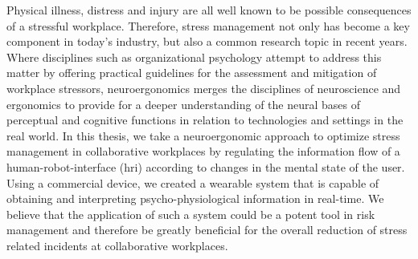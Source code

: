 
Physical illness, distress and injury are all well known to be possible consequences of a stressful workplace. 
Therefore, stress management not only has become a key component in today's industry, but also a common research topic in recent years. Where disciplines such as organizational psychology attempt to address this matter by offering practical guidelines for the assessment and mitigation of workplace stressors, neuroergonomics merges the disciplines of neuroscience and ergonomics to provide for a deeper understanding of the neural bases of perceptual and cognitive functions in relation to technologies and settings in the real world. 
In this thesis, we take a neuroergonomic approach to optimize stress management in collaborative workplaces by regulating the information flow of a human-robot-interface (\gls{hri}) according to changes in the mental state of the user. 
Using a commercial device, we created a wearable system that is capable of obtaining and interpreting psycho-physiological information in real-time.
We believe that the application of such a system could be a potent tool in risk management and therefore be greatly beneficial for the overall reduction of stress related incidents at collaborative workplaces.
